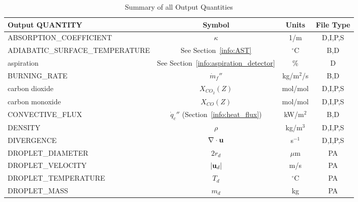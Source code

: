 \documentclass[11pt]{book}
\newcommand{\bu}{{\bf u}}
\newcommand{\dq}{\dot{q}}
\newcommand{\dm}{\dot{m}}
\begin{document}
\begin{table}[h!]
\begin{center}
\caption{Summary of all Output Quantities}
\begin{tabular}{|l|c|c|c|}
\hline
Output {\ct QUANTITY}                           & Symbol                                        & Units          & File Type    \\ \hline \hline
{\ct ABSORPTION\_COEFFICIENT}                   & $\kappa$                                      & 1/m            & D,I,P,S      \\ \hline
{\ct ADIABATIC\_SURFACE\_TEMPERATURE}           & See Section~\ref{info:AST}                    & $^\circ$C      & B,D          \\ \hline
{\ct aspiration}                                & See Section~\ref{info:aspiration_detector}    & \%             & D            \\ \hline
{\ct BURNING\_RATE}                             & $\dm_f''$                                     & kg/m$^2$/s     & B,D          \\ \hline
{\ct carbon dioxide}                            & $X_{CO_2}(Z)$                                 & mol/mol        & D,I,P,S      \\ \hline
{\ct carbon monoxide}                           & $X_{CO}(Z)$                                   & mol/mol        & D,I,P,S      \\ \hline
{\ct CONVECTIVE\_FLUX}                          & $\dq_c''$ (Section~\ref{info:heat_flux})      & kW/m$^2$       & B,D          \\ \hline
{\ct DENSITY}                                   & $\rho$                                        & kg/m$^3$       & D,I,P,S      \\ \hline
{\ct DIVERGENCE}                                & $\nabla \cdot \bu$                            & s$^{-1}$       & D,I,P,S      \\ \hline
{\ct DROPLET\_DIAMETER}                         & $2 r_d$                                       & $\mu$m         & PA           \\ \hline
{\ct DROPLET\_VELOCITY}                         & $|\bu_d|$                                     & m/s            & PA           \\ \hline
{\ct DROPLET\_TEMPERATURE}                      & $T_d$                                         & $^\circ$C      & PA           \\ \hline
{\ct DROPLET\_MASS}                             & $m_d$                                         & kg             & PA           \\ \hline

\end{tabular}
\end{center}
\end{table}
\end{document}
